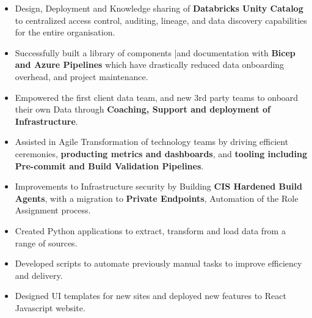 \documentclass[10pt,a4paper,ragged2e]{maltacv}
\begin{document}


\makecvheader


\bigskip

\begin{itemize}
  \item Design, Deployment and Knowledge sharing of \textbf{Databricks Unity Catalog} to centralized access control, auditing, lineage, and data discovery capabilities for the entire organisation.
  \item Successfully built a library of components |and documentation with \textbf{Bicep and Azure Pipelines} which have drastically reduced data onboarding overhead, and project maintenance.
  \item Empowered the first client data team, and new 3rd party teams to onboard their own Data through \textbf{Coaching, Support and deployment of Infrastructure}.
  \item Assisted in Agile Transformation of technology teams by driving efficient ceremonies, \textbf{producting metrics and dashboards}, and \textbf{tooling including Pre-commit and Build Validation Pipelines}.
  \item Improvements to Infrastructure security by Building \textbf{CIS Hardened Build Agents}, with a migration to \textbf{Private Endpoints}, Automation of the Role Assignment process.
\end{itemize}

\bigskip

\begin{itemize}
  \item Created Python applications to extract, transform and load data from a range of sources.
  \item Developed scripts to automate previously manual tasks to improve efficiency and delivery.
  \item Designed UI templates for new sites and deployed new features to React Javascript website.
\end{itemize}
\end{document}
